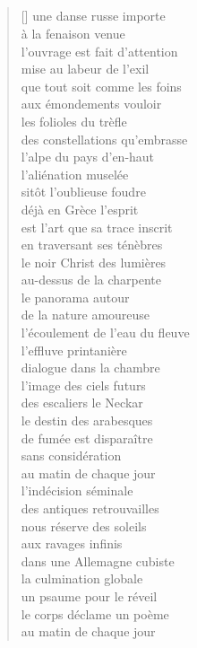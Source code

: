 \documentclass[a4paper, titlepage, twoside, 12pt]{book}
\begin{document}
\subsection*{}
\settowidth{\versewidth}{que tout soit comme les foins}
\begin{verse}[\versewidth]
une danse russe importe\\
à la fenaison venue\\
l'ouvrage est fait d'attention\\
mise au labeur de l'exil\\
que tout soit comme les foins\\
aux émondements vouloir\\
les folioles du trèfle\\
des constellations qu'embrasse\\
l'alpe du pays d'en-haut\\
l'aliénation muselée\\
sitôt l'oublieuse foudre\\
déjà en Grèce l'esprit\\
est l'art que sa trace inscrit\\
en traversant ses ténèbres\\
le noir Christ des lumières\\
au-dessus de la charpente\\
le panorama autour\\
de la nature amoureuse\\
l'écoulement de l'eau du fleuve\\
l'effluve printanière\\
dialogue dans la chambre\\
l'image des ciels futurs\\
des escaliers le Neckar\\
le destin des arabesques\\
de fumée est disparaître\\
sans considération\\
au matin de chaque jour\\
l'indécision séminale\\
des antiques retrouvailles\\
nous réserve des soleils\\
aux ravages infinis\\
dans une Allemagne cubiste\\
la culmination globale\\
un psaume pour le réveil\\
le corps déclame un poème\\
au matin de chaque jour
\end{verse}
\end{document}
